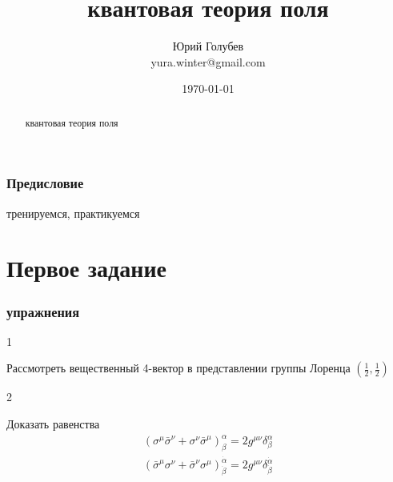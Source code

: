 \documentclass[a4paper,12pt]{article} %
\author{Юрий Голубев\\ yura.winter@gmail.com }
\title{квантовая теория поля}
\date{\today}
\begin{document}
\maketitle

\begin{abstract}
квантовая теория поля
\end{abstract}
\tableofcontents

\section*{Предисловие}

тренируемся, практикуемся


\clearpage
\part{Первое задание}


\section{упражнения}


\begin{task}

1

Рассмотреть вещественный 4-вектор в представлении группы Лоренца $\left(\frac{1}{2}, \frac{1}{2}\right)$



\end{task}




\begin{task}

2


Доказать равенства
$$
\begin{array}{l}
\left(\sigma^{\mu} \bar{\sigma}^{\nu}+\sigma^{\nu} \bar{\sigma}^{\mu}\right)_{\beta}^{\alpha}=2 g^{\mu \nu} \delta_{\beta}^{\alpha} \\
\left(\bar{\sigma}^{\mu} \sigma^{\nu}+\bar{\sigma}^{\nu} \sigma^{\mu}\right)_{\dot{\beta}}^{\dot{\alpha}}=2 g^{\mu \nu} \delta_{\dot{\beta}}^{\dot{\alpha}}
\end{array}
$$

\end{task}
\end{document}

